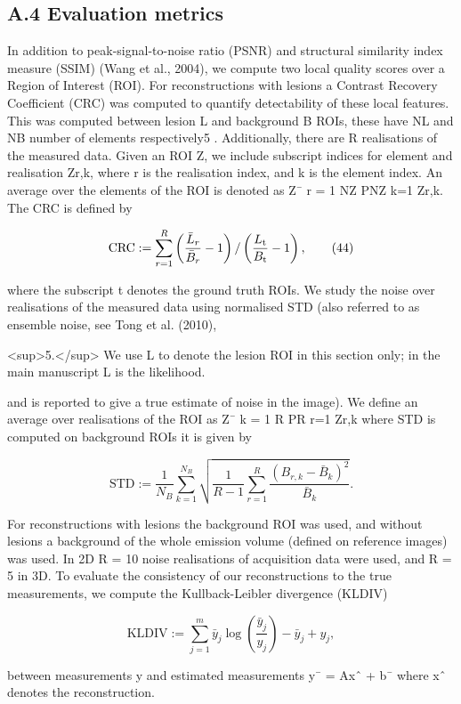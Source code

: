 \documentclass{article}
\begin{document}
\subsection{A.4 Evaluation metrics}

In addition to peak-signal-to-noise ratio (PSNR) and structural similarity index measure (SSIM) (Wang et al., 2004), we compute two local quality scores over a Region of Interest (ROI). For reconstructions with lesions a Contrast Recovery Coefficient (CRC) was computed to quantify detectability of these local features. This was computed between lesion L and background B ROIs, these have NL and NB number of elements respectively5 . Additionally, there are R realisations of the measured data. Given an ROI Z, we include subscript indices for element and realisation Zr,k, where r is the realisation index, and k is the element index. An average over the elements of the ROI is denoted as Z¯ r = 1 NZ PNZ k=1 Zr,k. The CRC is defined by

$${\rm CRC}:=\sum_{r=1}^{R}\left(\frac{\bar{L}_{r}}{\bar{B}_{r}}-1\right)/\left(\frac{L_{\rm t}}{B_{\rm t}}-1\right),\tag{44}$$

where the subscript t denotes the ground truth ROIs. We study the noise over realisations of the measured data using normalised STD (also referred to as ensemble noise, see Tong et al. (2010),

<sup>5.</sup> We use L to denote the lesion ROI in this section only; in the main manuscript L is the likelihood.

and is reported to give a true estimate of noise in the image). We define an average over realisations of the ROI as Z¯ k = 1 R PR r=1 Zr,k where STD is computed on background ROIs it is given by

$$\text{STD}:=\frac{1}{N_{B}}\sum_{k=1}^{N_{B}}\sqrt{\frac{1}{R-1}\sum_{r=1}^{R}\frac{(B_{r,k}-\bar{B}_{k})^{2}}{\bar{B}_{k}}}.\tag{45}$$

For reconstructions with lesions the background ROI was used, and without lesions a background of the whole emission volume (defined on reference images) was used. In 2D R = 10 noise realisations of acquisition data were used, and R = 5 in 3D. To evaluate the consistency of our reconstructions to the true measurements, we compute the Kullback-Leibler divergence (KLDIV)

$$\text{KLDIV}:=\sum_{j=1}^{m}\bar{y}_{j}\log\left(\frac{\bar{y}_{j}}{y_{j}}\right)-\bar{y}_{j}+y_{j},\tag{46}$$

between measurements y and estimated measurements y¯ = Axˆ + b¯ where xˆ denotes the reconstruction.
\end{document}
